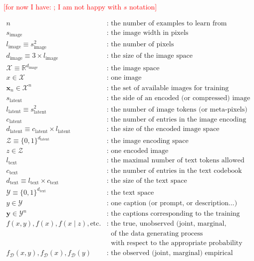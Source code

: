 \documentclass{article}
\begin{document}
\textcolor{red}{[for now I have: ; I am not happy with $s$ notation]}

\newcommand{\si}{s_{\mathrm{image}}}
\newcommand{\li}{l_{\mathrm{image}}}
\newcommand{\di}{d_{\mathrm{image}}}
\newcommand{\xn}{\mathbf{x}_n}
\newcommand{\dl}{{d_{\mathrm{latent}}}}
\newcommand{\lt}{{l_{\mathrm{text}}}}
\newcommand{\ct}{{c_{\mathrm{text}}}}
\newcommand{\dt}{{d_{\mathrm{text}}}}
\newcommand{\fd}{{f_{\mathcal{D}}}}

$$
\begin{aligned}
n & \text{: the number of examples to learn from} \\
\si & \text{: the image width in pixels} \\
\li \equiv s_{\text{image}}^2 & \text{: the number of pixels} \\
\di \equiv3\times l_{\text{image}} & \text{: the size of the image space} \\
\mathcal{X}\equiv \mathbb{R}^{d_{\text{image}}} & \text{: the image space} \\
x \in \mathcal{X} & \text{: one image} \\
\xn \in \mathcal{X}^n & \text{: the set of available images for training} \\
s_\text{latent} & \text{: the side of an encoded (or compressed) image} \\
l_\text{latent}\equiv s_\text{latent}^2 & \text{: the number of image tokens (or meta-pixels) in an encoded image} \\
c_\text{latent} & \text{: the number of entries in the image encoding codebook} \\
d_\text{latent} \equiv c_\text{latent} \times l_\text{latent} & \text{: the size of the encoded image space} \\
\mathcal{Z}\equiv\{0,1\}^{d_\text{latent}} & \text{: the image encoding space} \\
z \in \mathcal{Z} & \text{: one encoded image} \\
\lt & \text{: the maximal number of text tokens allowed} \\
\ct & \text{: the number of entries in the text codebook (or dictionary)} \\
\dt \equiv \lt \times \ct & \text{: the size of the text space} \\
\mathcal{Y}\equiv \{0,1\}^{\dt} & \text{: the text space} \\
y \in \mathcal{Y} & \text{: one caption (or prompt, or description...)} \\
\mathbf{y} \in \mathcal{Y}^n & \text{: the captions corresponding to the training images} \\
f(x,y), f(x), f(x \mid z), \text{etc.} & \text{: the true, unobserved (joint, marginal, conditional) density} \\
& \phantom{\text{: }}\text{of the data generating process} \\
& \phantom{\text{: }}\text{with respect to the appropriate probability measure} \\
\fd(x,y), \fd(x), \fd(y) & \text{: the observed (joint, marginal) empirical density}
\end{aligned}
$$
\end{document}
